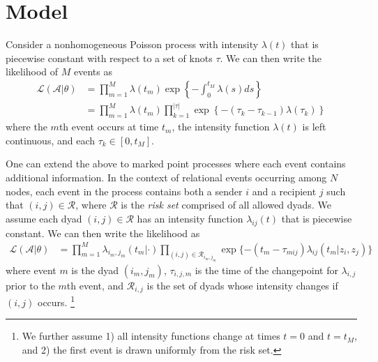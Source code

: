 \documentclass[11pt]{article}
\begin{document}
\section{Model}

Consider a nonhomogeneous Poisson process with  intensity $\lambda(t)$ that is piecewise constant with respect to a set of knots $\tau$.  We can then write the likelihood of $M$ events as
\begin{align}
\mathcal{L}(\mathcal{A}|\theta) &= \prod_{m=1}^M \lambda(t_m) \exp\left\{ - \int_{0}^{t_M} \lambda(s)ds \right\} \\
&= \prod_{m=1}^M \lambda(t_m) \prod_{k=1}^{|\tau|} \exp\left\{ - (\tau_{k} - \tau_{k-1}) \lambda(\tau_k) \right\}
\end{align}
\noindent where the $m$th event occurs at time $t_m$, the intensity function $\lambda(t)$ is left continuous, and each $\tau_k \in [0,t_M]$.

One can extend the above to marked point processes where each event contains additional information.  In the context of relational events occurring among $N$ nodes, each event in the process contains both a sender $i$ and a recipient $j$ such that  $(i,j) \in \mathcal{R}$, where $\mathcal{R}$ is the \emph{risk set} comprised of all allowed dyads.  We assume each dyad $(i,j) \in \mathcal{R}$ has an intensity function $\lambda_{ij}(t)$ that is piecewise constant.  We can then write the likelihood as  
\begin{align}
\mathcal{L}(\mathcal{A}|\theta) &= \prod_{m=1}^M \lambda_{i_m,j_m}(t_m|\cdot) \prod_{(i,j) \in \mathcal{R}_{i_m,j_m}}\exp\{ - (t_m - \tau_{mij}) \lambda_{ij}(t_m | z_i,z_j) \}
\label{eqn:llk}
\end{align}
\noindent where event $m$ is the dyad $(i_m,j_m)$, $\tau_{i,j,m}$ is the time  of the changepoint for $\lambda_{i,j}$ prior to the $m$th event, and $\mathcal{R}_{i,j}$ is the set of dyads whose intensity changes if $(i,j)$ occurs. \footnote{We further assume 1) all intensity functions change at times $t=0$ and $t=t_M$, and 2) the first event is drawn uniformly from the risk set.}
\end{document}
